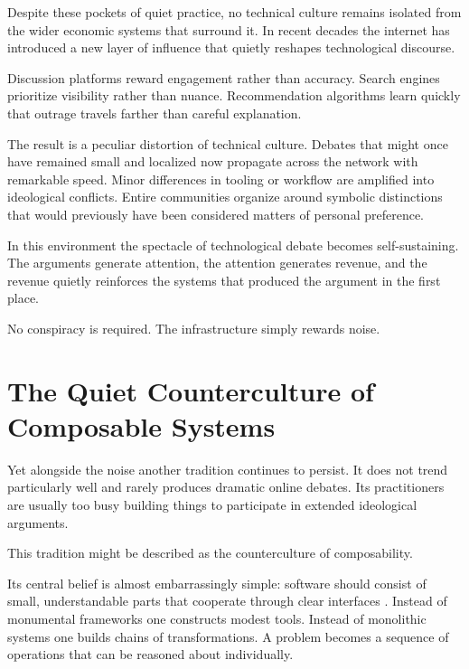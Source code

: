 \documentclass[12pt]{article}
\theoremstyle{definition}
\begin{document}
Despite these pockets of quiet practice, no technical culture remains
isolated from the wider economic systems that surround it. In recent
decades the internet has introduced a new layer of influence that quietly
reshapes technological discourse.

Discussion platforms reward engagement rather than accuracy. Search
engines prioritize visibility rather than nuance. Recommendation
algorithms learn quickly that outrage travels farther than careful
explanation.

The result is a peculiar distortion of technical culture. Debates that
might once have remained small and localized now propagate across the
network with remarkable speed. Minor differences in tooling or workflow
are amplified into ideological conflicts. Entire communities organize
around symbolic distinctions that would previously have been considered
matters of personal preference.

In this environment the spectacle of technological debate becomes
self-sustaining. The arguments generate attention, the attention
generates revenue, and the revenue quietly reinforces the systems that
produced the argument in the first place.

No conspiracy is required. The infrastructure simply rewards noise.

\section{The Quiet Counterculture of Composable Systems}

Yet alongside the noise another tradition continues to persist. It does
not trend particularly well and rarely produces dramatic online debates.
Its practitioners are usually too busy building things to participate in
extended ideological arguments.

This tradition might be described as the counterculture of composability.

Its central belief is almost embarrassingly simple: software should
consist of small, understandable parts that cooperate through clear
interfaces \cite{mcilroy1978,raymond2003}. Instead of monumental
frameworks one constructs modest tools. Instead of monolithic systems
one builds chains of transformations. A problem becomes a sequence of
operations that can be reasoned about individually.
\end{document}
